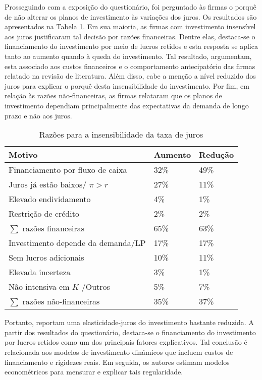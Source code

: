 \documentclass[11pt]{article}
\begin{document}
Prosseguindo com a exposição do questionário, foi perguntado às firmas o porquê de não alterar os planos de investimento às variações dos juros.
Os resultados são apresentados na Tabela \ref{tab:resultsN}.
Em sua maioria, as firmas com investimento insensível aos juros justificaram tal decisão por razões financeiras.
Dentre elas, destaca-se o financiamento do investimento por meio de lucros retidos e esta resposta se aplica tanto ao aumento quando à queda do investimento.
Tal resultado, argumentam, esta associado aos custos financeiros e o comportamento antecipatório das firmas relatado na revisão de literatura.
Além disso, cabe a menção a nível reduzido dos juros para explicar o porquê desta insensibilidade do investimento.
Por fim, em relação às razões não-financeiras, as firmas relataram que os planos de investimento dependiam principalmente das expectativas da demanda de longo prazo e não aos juros.

\begin{table}[htbp]
\caption{\label{tab:resultsN}Razões para a insensibilidade da taxa de juros}
\centering
\begin{tabular}{lll}
\hline
Motivo & Aumento & Redução\\
\hline
Financiamento por fluxo de caixa & 32\% & 49\%\\
Juros já estão baixos/ \(\pi > r\) & 27\% & 11\%\\
Elevado endividamento & 4\% & 1\%\\
Restrição de crédito & 2\% & 2\%\\
\hline
\(\sum\) razões financeiras & 65\% & 63\%\\
\hline
Investimento depende da demanda/LP & 17\% & 17\%\\
Sem lucros adicionais & 10\% & 11\%\\
Elevada incerteza & 3\% & 1\%\\
Não intensiva em \(K\) /Outros & 5\% & 7\%\\
\hline
\(\sum\) razões não-financeiras & 35\% & 37\%\\
\hline
\end{tabular}
\end{table}


Portanto, \textcite{sharpe_2020_Why} reportam uma elasticidade-juros do investimento bastante reduzida.
A partir dos resultados do questionário, destaca-se o financiamento do investimento por lucros retidos como um dos principais fatores explicativos.
Tal conclusão é relacionada aos modelos de investimento dinâmicos que incluem custos de financiamento e rigidezes reais.
Em seguida, os autores estimam modelos econométricos para mensurar e explicar tais regularidade.
\end{document}
